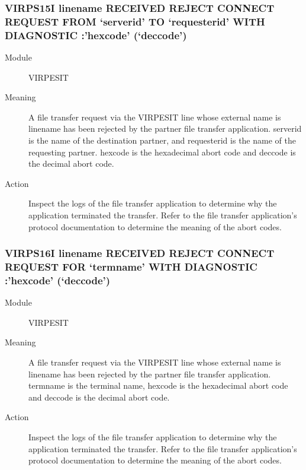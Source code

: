 \documentclass[letterpaper,10pt,english]{sphinxmanual}
\begin{document}
\subsubsection{VIRPS15I linename RECEIVED REJECT CONNECT REQUEST FROM ‘serverid’ TO ‘requesterid’ WITH DIAGNOSTIC :’hexcode’ (‘deccode’)}
\label{\detokenize{messages:virps15i-linename-received-reject-connect-request-from-serverid-to-requesterid-with-diagnostic-hexcode-deccode}}\begin{description}
\item[{Module}] \leavevmode
VIRPESIT

\item[{Meaning}] \leavevmode
A file transfer request via the VIRPESIT line whose external name is linename has been rejected by the partner file transfer application. serverid is the name of the destination partner, and requesterid is the name of the requesting partner. hexcode is the hexadecimal abort code and deccode is the decimal abort code.

\item[{Action}] \leavevmode
Inspect the logs of the file transfer application to determine why the application terminated the transfer. Refer to the file transfer application’s protocol documentation to determine the meaning of the abort codes.

\end{description}


\subsubsection{VIRPS16I linename RECEIVED REJECT CONNECT REQUEST FOR ‘termname’ WITH DIAGNOSTIC :’hexcode’ (‘deccode’)}
\label{\detokenize{messages:virps16i-linename-received-reject-connect-request-for-termname-with-diagnostic-hexcode-deccode}}\begin{description}
\item[{Module}] \leavevmode
VIRPESIT

\item[{Meaning}] \leavevmode
A file transfer request via the VIRPESIT line whose external name is linename has been rejected by the partner file transfer application. termname is the terminal name, hexcode is the hexadecimal abort code and deccode is the decimal abort code.

\item[{Action}] \leavevmode
Inspect the logs of the file transfer application to determine why the application terminated the transfer. Refer to the file transfer application’s protocol documentation to determine the meaning of the abort codes.

\end{description}
\end{document}
